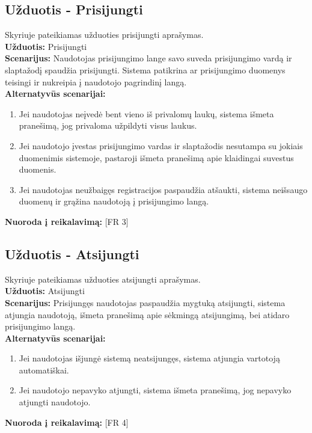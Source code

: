 \documentclass{VUMIFPSkursinis}
\begin{document}
	\subsection{Užduotis - Prisijungti}
	Skyriuje pateikiamas užduoties prisijungti aprašymas.\\
	\textbf{Užduotis:}  Prisijungti \\
	\textbf{Scenarijus:} Naudotojas prisijungimo lange savo suveda prisijungimo vardą ir slaptažodį spaudžia prisijungti. Sistema patikrina ar prisijungimo duomenys teisingi ir nukreipia į naudotojo pagrindinį langą. \\
	\textbf{Alternatyvūs scenarijai:}
	\begin{enumerate}
		\item Jei naudotojas neįvedė bent vieno iš privalomų laukų, sistema išmeta pranešimą, jog privaloma užpildyti visus laukus.
		\item Jei naudotojo įvestas prisijungimo vardas ir slaptažodis nesutampa su jokiais duomenimis sistemoje, pastaroji išmeta pranešimą apie klaidingai suvestus duomenis.
		\item Jei naudotojas neužbaigęs registracijos paspaudžia atšaukti, sistema neišsaugo duomenų ir grąžina naudotoją į prisijungimo langą. 
	\end{enumerate}
	\textbf{Nuoroda į reikalavimą: } [FR 3]
	
	\subsection{Užduotis - Atsijungti}
	Skyriuje pateikiamas užduoties atsijungti aprašymas.\\
	\textbf{Užduotis:}  Atsijungti \\
	\textbf{Scenarijus:} Prisijungęs naudotojas paspaudžia mygtuką atsijungti, sistema atjungia naudotoją, išmeta pranešimą apie sėkmingą atsijungimą, bei atidaro prisijungimo langą. \\
	\textbf{Alternatyvūs scenarijai:}
	\begin{enumerate}
		\item Jei naudotojas išjungė sistemą neatsijungęs, sistema atjungia vartotoją automatiškai. 
		\item Jei naudotojo nepavyko atjungti, sistema išmeta pranešimą, jog nepavyko atjungti naudotojo. 
	\end{enumerate}
	\textbf{Nuoroda į reikalavimą: } [FR 4]
	
\end{document}
